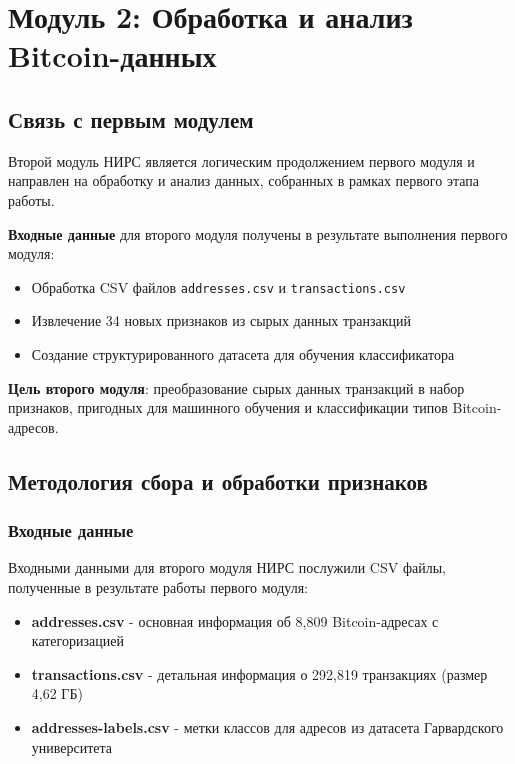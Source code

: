 \section{Модуль 2: Обработка и анализ Bitcoin-данных}

\subsection{Связь с первым модулем}

Второй модуль НИРС является логическим продолжением первого модуля и направлен на обработку и анализ данных, собранных в рамках первого этапа работы. 

\textbf{Входные данные} для второго модуля получены в результате выполнения первого модуля:
\begin{itemize}
    \item Обработка CSV файлов \texttt{addresses.csv} и \texttt{transactions.csv}
    \item Извлечение 34 новых признаков из сырых данных транзакций
    \item Создание структурированного датасета для обучения классификатора
\end{itemize}

\textbf{Цель второго модуля}: преобразование сырых данных транзакций в набор признаков, пригодных для машинного обучения и классификации типов Bitcoin-адресов.

\subsection{Методология сбора и обработки признаков}

\subsubsection{Входные данные}

Входными данными для второго модуля НИРС послужили CSV файлы, полученные в результате работы первого модуля:

\begin{itemize}
    \item \textbf{addresses.csv} - основная информация об 8,809 Bitcoin-адресах с категоризацией
    \item \textbf{transactions.csv} - детальная информация о 292,819 транзакциях (размер 4,62 ГБ)
    \item \textbf{addresses-labels.csv} - метки классов для адресов из датасета Гарвардского университета
\end{itemize}

